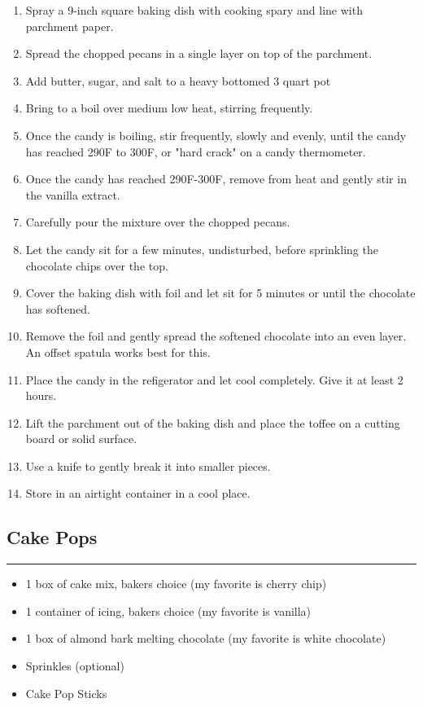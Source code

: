 \documentclass{article}
\begin{document}
\begin{enumerate}
    \item 
        Spray a 9-inch square baking dish with cooking spary and line with parchment paper.
    \item 
        Spread the chopped pecans in a single layer on top of the parchment.
    \item 
        Add butter, sugar, and salt to a heavy bottomed 3 quart pot
    \item 
        Bring to a boil over medium low heat, stirring frequently.
    \item 
        Once the candy is boiling, stir frequently, slowly and evenly, until the candy has reached 290F to 300F, or "hard crack" on a candy thermometer.
    \item
        Once the candy has reached 290F-300F, remove from heat and gently stir in the vanilla extract.
    \item 
        Carefully pour the mixture over the chopped pecans.
    \item 
        Let the candy sit for a few minutes, undisturbed, before sprinkling the chocolate chips over the top.
    \item 
        Cover the baking dish with foil and let sit for 5 minutes or until the chocolate has softened.
    \item 
        Remove the foil and gently spread the softened chocolate into an even layer. An offset spatula works best for this.
    \item
        Place the candy in the refigerator and let cool completely. Give it at least 2 hours.
    \item 
        Lift the parchment out of the baking dish and place the toffee on a cutting board or solid surface.
    \item 
        Use a knife to gently break it into smaller pieces.
    \item 
        Store in an airtight container in a cool place.
\end{enumerate}
\newpage

\subsection{Cake Pops} 
\noindent\rule[0.5ex]{\linewidth}{1pt}

\begin{framed}
    \begin{itemize}
        \item
            1 box of cake mix, bakers choice (my favorite is cherry chip)
        \item 
            1 container of icing, bakers choice (my favorite is vanilla)
        \item 
            1 box of almond bark melting chocolate (my favorite is white chocolate)
        \item 
            Sprinkles (optional)
        \item 
            Cake Pop Sticks
    \end{itemize}
\end{framed}
\end{document}
